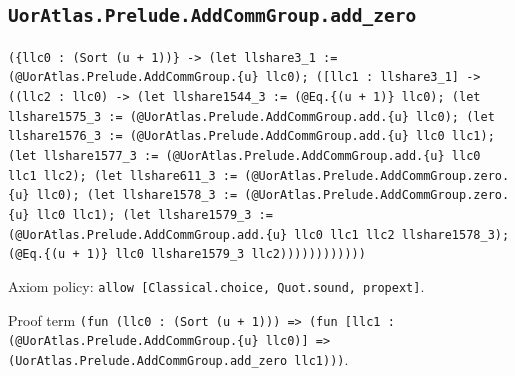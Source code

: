 \documentclass[11pt]{article}
\begin{document}
\subsection*{\texttt{UorAtlas.Prelude.AddCommGroup.add\_zero}}
\noindent\texttt{(\{llc0 : (Sort (u + 1))\} -> (let llshare3\_1 := (@UorAtlas.Prelude.AddCommGroup.\{u\} llc0); ([llc1 : llshare3\_1] -> ((llc2 : llc0) -> (let llshare1544\_3 := (@Eq.\{(u + 1)\} llc0); (let llshare1575\_3 := (@UorAtlas.Prelude.AddCommGroup.add.\{u\} llc0); (let llshare1576\_3 := (@UorAtlas.Prelude.AddCommGroup.add.\{u\} llc0 llc1); (let llshare1577\_3 := (@UorAtlas.Prelude.AddCommGroup.add.\{u\} llc0 llc1 llc2); (let llshare611\_3 := (@UorAtlas.Prelude.AddCommGroup.zero.\{u\} llc0); (let llshare1578\_3 := (@UorAtlas.Prelude.AddCommGroup.zero.\{u\} llc0 llc1); (let llshare1579\_3 := (@UorAtlas.Prelude.AddCommGroup.add.\{u\} llc0 llc1 llc2 llshare1578\_3); (@Eq.\{(u + 1)\} llc0 llshare1579\_3 llc2))))))))))))}\par
\noindent Axiom policy: \texttt{allow [Classical.choice, Quot.sound, propext]}.\par
\noindent Proof term \texttt{(fun (llc0 : (Sort (u + 1))) => (fun [llc1 : (@UorAtlas.Prelude.AddCommGroup.\{u\} llc0)] => (UorAtlas.Prelude.AddCommGroup.add\_zero llc1)))}.\par
\end{document}
